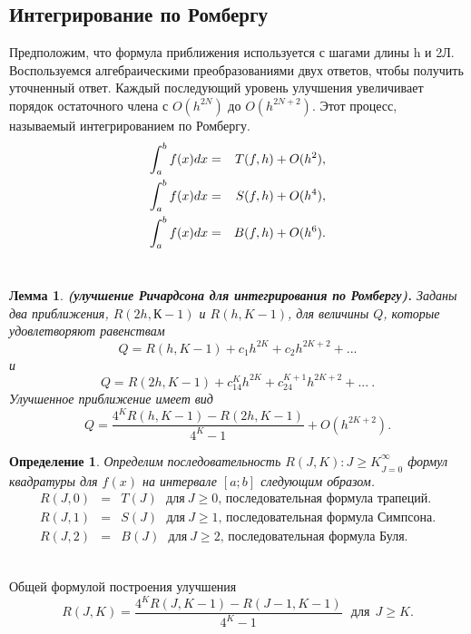 \documentclass[14pt, titlepage, a4paper]{extarticle} %
\newtheorem{definition}{Определение}
\newtheorem{lemma}{Лемма}
\begin{document}
	\subsection*{Интегрирование по Ромбергу}
	
	Предположим, что формула приближения используется с шагами длины h и 2Л. Воспользуемся алгебраическими преобразованиями двух ответов, чтобы получить уточненный ответ. Каждый последующий уровень улучшения увеличивает порядок остаточного члена с $O(h^{2N})$ до $O(h^{2N+2})$. Этот процесс, называемый интегрированием по Ромбергу.
	\begin{eqnarray}
		\nonumber
		\int_{a}^{b}{f(x)dx} &=& T(f,h)+O(h^2),
		\nonumber
		\cr \int_{a}^{b}{f(x)dx} &=& S(f,h)+O(h^4),
		\nonumber
		\cr \int_{a}^{b}{f(x)dx} &=& B(f,h)+O(h^6).
	\end{eqnarray}
	~\\
	
	\begin{lemma}
		\textbf{(улучшение Ричардсона для интегрирования по Ромбергу).} Заданы два приближения, $R(2h,К-1)$ и $R(h,K-1)$, для величины $Q$, которые
		удовлетворяют равенствам
		\begin{equation}\label{eq:28}
			Q = R(h,K-1)+c_1h^{2K}+c_2h^{2K+2}+...
		\end{equation}
		и
		\begin{equation}\label{eq:29}
			Q = R(2h,K-1)+c_14^Kh^{2K}+c_24^{K+1}h^{2K+2}+...~.
		\end{equation}
		Улучшенное приближение имеет вид
		\begin{equation}\label{eq:30}
			Q = \frac{4^KR(h,K-1)-R(2h,K-1)}{4^K-1}+O(h^{2K+2}).
		\end{equation}
	\end{lemma}


	\begin{definition}\label{df:7.4}
		Определим последовательность ${R(J,K):J\ge K}^{\infty}_{J=0}$ формул квадратуры для $f(x)$ на интервале $[a;b]$ следующим образом.
		\begin{eqnarray}
			\nonumber
			R(J,0) &=& T(J)~~~\text{для}~J\ge 0\text{, последовательная формула трапеций.}\\
			\nonumber
			R(J,1) &=& S(J)~~~\text{для}~J\ge 1\text{, последовательная формула Симпсона.}\\
			\label{eq:31}
			R(J,2) &=& B(J)~~~\text{для}~J\ge 2\text{, последовательная формула Буля.}
		\end{eqnarray}
	\end{definition}
	~\\
	Общей формулой построения улучшения
	\begin{equation}\label{eq:33}
		R(J,K) = \frac{4^KR(J,K-1)-R(J-1,K-1)}{4^K-1}~~~\text{для}~~J\ge K.
	\end{equation}
	
\end{document}
